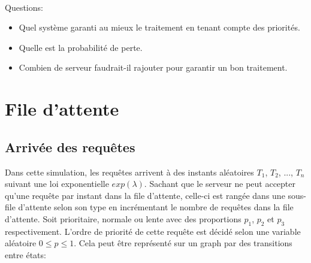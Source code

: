 \documentclass[12pt,a4paper]{article}
\begin{document}
        \paragraph{}
        Questions:
        \begin{itemize}
            \item Quel système garanti au mieux le traitement en tenant compte des priorités.
            \item Quelle est la probabilité de perte.
            \item Combien de serveur faudrait-il rajouter pour garantir un bon traitement.
        \end{itemize}
        
    
    \newpage{}
    \section{File d'attente}
        
        \subsection{Arrivée des requêtes}

        \par Dans cette simulation, les requêtes arrivent à des instants aléatoires $T_1$, $T_2$, ..., $T_n$ suivant une loi exponentielle $exp(\lambda)$.\newline
        Sachant que le serveur ne peut accepter qu'une requête par instant dans la file d'attente, celle-ci est rangée dans une sous-file d'attente selon son type en incrémentant le nombre de requêtes dans la file d'attente.
        Soit prioritaire, normale ou lente avec des proportions $p_1$, $p_2$ et $p_3$ respectivement.\newline
        L'ordre de priorité de cette requête est décidé selon une variable aléatoire $0\leq p\leq 1$.
        Cela peut être représenté sur un graph par des transitions entre états: 
        
\end{document}
